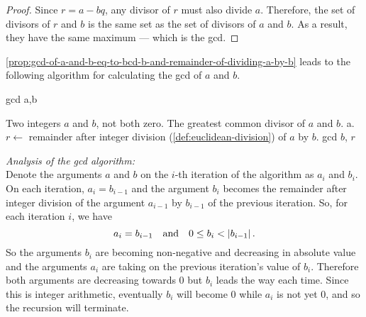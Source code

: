 \documentclass[../MathsNotesBase.tex]{subfiles}
\begin{document}
{		
		\bigskip
		\begin{proof}
			Since ${ r = a - bq }$, any divisor of $r$ must also divide $a$. Therefore, the set of divisors of $r$ and $b$ is the same set as the set of divisors of $a$ and $b$. As a result, they have the same maximum --- which is the gcd.
		\end{proof}
		
		\biggerskip
		\nl[3]
		\autoref{prop:gcd-of-a-and-b-eq-to-bcd-b-and-remainder-of-dividing-a-by-b} leads to the following algorithm for calculating the gcd of $a$ and $b$.
		\begin{algorithm}[H]
			\caption{gcd a,b}
			\begin{algorithmic}
				\REQUIRE Two integers $a$ and $b$, not both zero.
				\ENSURE The greatest common divisor of $a$ and $b$.
				\STATE %
				\RETURN a.
				\ELSE
				\STATE ${ r \leftarrow }$ remainder after integer division (\ref{def:euclidean-division}) of $a$ by $b$.
				\RETURN gcd $b$, $r$
				\ENDIF 
			\end{algorithmic}	
		\end{algorithm}
	
		\textit{Analysis of the gcd algorithm:}\\
		
		Denote the arguments $a$ and $b$ on the $i$-th iteration of the algorithm as $a_i$ and $b_i$.\\
		
		On each iteration, ${ a_i = b_{i-1} }$ and the argument $b_i$ becomes the remainder after integer division of the argument $a_{i-1}$ by $b_{i-1}$ of the previous iteration. So, for each iteration $i$, we have 
			\[ a_i = b_{i-1} \hspace{10pt}\text{and}\hspace{10pt} 0 \leq b_i < \left\lvert b_{i-1}\right\rvert. \]
		So the arguments $b_i$ are becoming non-negative and decreasing in absolute value and the arguments $a_i$ are taking on the previous iteration's value of $b_i$. Therefore both arguments are decreasing towards 0 but $b_i$ leads the way each time. Since this is integer arithmetic, eventually $b_i$ will become 0 while $a_i$ is not yet 0, and so the recursion will terminate.
		
}
\end{document}
